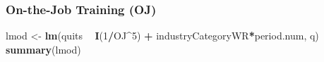 \documentclass[
]{article}
\newenvironment{Shaded}{\begin{snugshade}}{\end{snugshade}}
\newcommand{\DecValTok}[1]{\textcolor[rgb]{0.00,0.00,0.81}{#1}}
\newcommand{\KeywordTok}[1]{\textcolor[rgb]{0.13,0.29,0.53}{\textbf{#1}}}
\newcommand{\NormalTok}[1]{#1}
\newcommand{\OperatorTok}[1]{\textcolor[rgb]{0.81,0.36,0.00}{\textbf{#1}}}
\newcommand{\StringTok}[1]{\textcolor[rgb]{0.31,0.60,0.02}{#1}}
\begin{document}
\hypertarget{on-the-job-training-oj-2}{%
\subsubsection{On-the-Job Training
(OJ)}\label{on-the-job-training-oj-2}}

\begin{Shaded}
\begin{Highlighting}[]
\NormalTok{lmod <-}\StringTok{ }\KeywordTok{lm}\NormalTok{(quits }\OperatorTok{~}\StringTok{ }\KeywordTok{I}\NormalTok{(}\DecValTok{1}\OperatorTok{/}\NormalTok{OJ}\OperatorTok{^}\DecValTok{5}\NormalTok{) }\OperatorTok{+}\StringTok{ }\NormalTok{industryCategoryWR}\OperatorTok{*}\NormalTok{period.num, q)}
\KeywordTok{summary}\NormalTok{(lmod)}
\end{Highlighting}
\end{Shaded}
\end{document}
